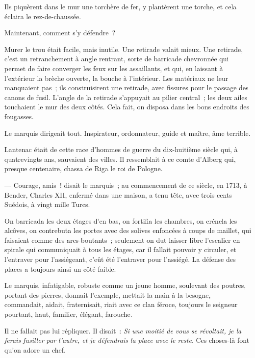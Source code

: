 \documentclass[french,twoside]{book} %
\begin{document}
Ils piquèrent dans le mur une torchère de fer, y plantèrent une torche, et cela éclaira le rez-de-chaussée.\par
Maintenant, comment s’y défendre ?\par
Murer le trou était facile, mais inutile. Une retirade valait mieux. Une retirade, c’est un retranchement à angle rentrant, sorte de barricade chevronnée qui permet de faire converger les feux sur les assaillants, et qui, en laissant à l’extérieur la brèche ouverte, la bouche à l’intérieur. Les matériaux ne leur manquaient pas ; ils construisirent une retirade, avec fissures pour le passage des canons de fusil. L’angle de la retirade s’appuyait au pilier central ; les deux ailes touchaient le mur des deux côtés. Cela fait, on disposa dans les bons endroits des fougasses.\par
 Le marquis dirigeait tout. Inspirateur, ordonnateur, guide et maître, âme terrible.\par
Lantenac était de cette race d’hommes de guerre du dix-huitième siècle qui, à quatrevingts ans, sauvaient des villes. Il ressemblait à ce comte d’Alberg qui, presque centenaire, chassa de Riga le roi de Pologne.\par
— Courage, amis ! disait le marquis ; au commencement de ce siècle, en 1713, à Bender, Charles XII, enfermé dans une maison, a tenu tête, avec trois cents Suédois, à vingt mille Turcs.\par
On barricada les deux étages d’en bas, on fortifia les chambres, on crénela les alcôves, on contrebuta les portes avec des solives enfoncées à coups de maillet, qui faisaient comme des arcs-boutants ; seulement on dut laisser libre l’escalier en spirale qui communiquait à tous les étages, car il fallait pouvoir y circuler, et l’entraver pour l’assiégeant, c’eût été l’entraver pour l’assiégé. La défense des places a toujours ainsi un côté faible.\par
Le marquis, infatigable, robuste comme un jeune homme, soulevant des poutres, portant des pierres, donnait l’exemple, mettait la main à la besogne, commandait, aidait, fraternisait, riait avec ce clan féroce, toujours le seigneur pourtant, haut, familier, élégant, farouche.\par
Il ne fallait pas lui répliquer. Il disait : \emph{Si une moitié de vous se révoltait, je la ferais fusiller par l’autre, et je défendrais la place avec le reste}. Ces choses-là font qu’on adore un chef.
\end{document}
